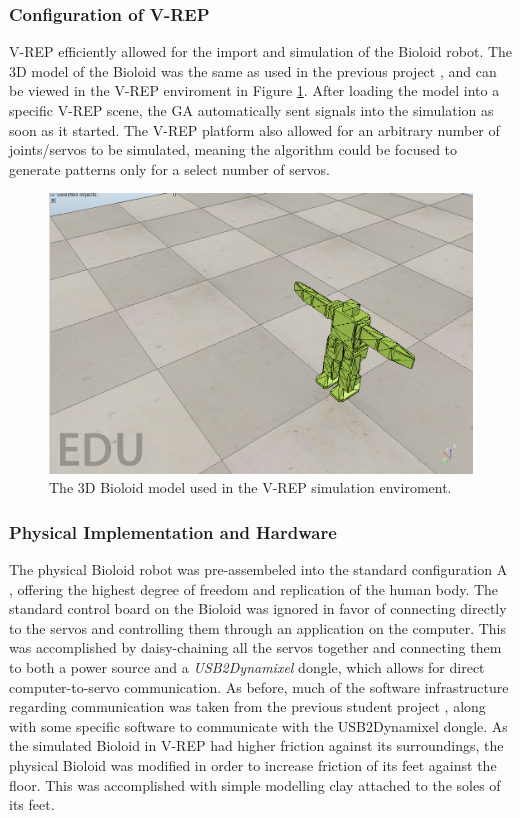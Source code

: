 \subsubsection{Configuration of V-REP}
V-REP efficiently allowed for the import and simulation of the Bioloid robot. The 3D model of the Bioloid was the same as used in the previous project \cite{studentProj}, and can be viewed in the V-REP enviroment in Figure \ref{fig:freeBioloid}. After loading the model into a specific V-REP scene, the GA automatically sent signals into the simulation as soon as it started. The V-REP platform also allowed for an arbitrary number of joints/servos to be simulated, meaning the algorithm could be focused to generate patterns only for a select number of servos.  
\begin{figure}[htbp]
    \centering
    \includegraphics[scale=0.25]{include/figure/freeBioloid.png}
    \caption{The 3D Bioloid model used in the V-REP simulation enviroment.}
    \label{fig:freeBioloid}
\end{figure}
\subsubsection{Physical Implementation and Hardware}
The physical Bioloid robot was pre-assembeled into the standard configuration A \cite{bioloidMan}, offering the highest degree of freedom and replication of the human body. The standard control board on the Bioloid was ignored in favor of connecting directly to the servos and controlling them through an application on the computer. This was accomplished by daisy-chaining all the servos together and connecting them to both a power source and a \textit{USB2Dynamixel} \cite{dongle} dongle, which allows for direct computer-to-servo communication. As before, much of the software infrastructure regarding communication was taken from the previous student project \cite{studentProj}, along with some specific software to communicate with the USB2Dynamixel dongle. As the simulated Bioloid in V-REP had higher friction against its surroundings, the physical Bioloid was modified in order to increase friction of its feet against the floor. This was accomplished with simple modelling clay attached to the soles of its feet.
